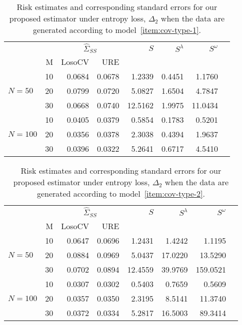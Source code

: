 \documentclass[12pt]{article}
\theoremstyle{definition}
\begin{document}
\begin{table}[H] \label{table:simulation-1-entropy-loss-sigma-1}
\centering
\caption{Risk estimates and corresponding standard errors for our proposed estimator under entropy loss, $\Delta_2$ when the data are generated according to model~\ref{item:cov-type-1}.} 
\begin{tabular}{l|r|rrrrrr}
&  & \multicolumn{2}{c}{$\hat{\Sigma}_{SS}$} & $S$ & $S^\lambda$ & $S^\omega$ \\ 
&M & \mbox{LosoCV} & \mbox{URE} &  \\ 
  \hline
&    10 & 0.0684 & 	0.0678	&1.2339 & 0.4451 & 1.1760\\ 
$N = 50$ &    20 & 0.0799 & 	0.0720	&5.0827 & 1.6504 & 4.7847 \\ 
  &    30 & 0.0668 &	0.0740	 &12.5162  & 1.9975 & 11.0434 \\ 
   \hdashline
 &    10 & 0.0405 & 0.0379 & 0.5854  & 0.1783 & 0.5201 \\ 
$N = 100$ &    20 & 0.0356 &  0.0378 & 2.3038 & 0.4394 & 1.9637 \\ 
  &    30 & 0.0396 & 0.0322  &5.2641 & 0.6717 & 4.5410 \\ 
\end{tabular}
\end{table}



\begin{table}[H] \label{table:simulation-1-entropy-loss-sigma-2}
\centering
\caption{Risk estimates and corresponding standard errors for our proposed estimator under entropy loss, $\Delta_2$ when the data are generated according to model~\ref{item:cov-type-2}.} \begin{tabular}{l|r|rrrrrr}
&  & \multicolumn{2}{c}{$\hat{\Sigma}_{SS}$} & $S$ & $S^\lambda$ & $S^\omega$ \\ 
&M & \mbox{LosoCV} & \mbox{URE} &  \\ 
  \hline
 &    10 & 0.0647 & 0.0696	 & 1.2431 & 1.4242 & 1.1195\\ 
$N = 50$ &    20 & 0.0884 & 0.0969 & 5.0437 & 17.0220 & 13.5290\\ 
&    30 & 0.0702 & 0.0894 & 12.4559 & 39.9769 & 159.0521 \\ 
   \hdashline
&    10 & 0.0307 & 0.0302 & 0.5403& 0.7659 & 0.5609 \\ 
$N = 100 $ &    20 & 0.0357 & 0.0350  & 2.3195 & 8.5141 & 11.3740 \\ 
   &    30 & 0.0372 & 0.0334 & 5.2817& 16.5003 & 89.3414  \\ 
\end{tabular}
\end{table}
\end{document}
